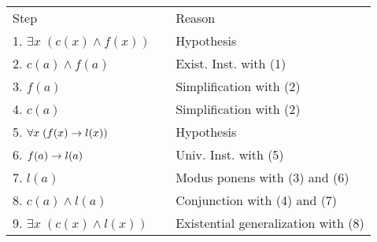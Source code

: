 \begin{questions}
\begin{solution}
\begin{itemize}[itemsep=0pt,parsep=0pt,topsep=0pt,partopsep=0pt]
        \smallskip
        \begin{tabular}{lll}
            Step                    & \hspace{0.15in} & Reason \\
            1. $\exists x\; (c(x) \wedge f(x))$     & & Hypothesis \\
            2. $c(a) \wedge f(a)$                   & & Exist. Inst. with (1) \\
            3. $f(a)$                               & & Simplification with (2) \\
            4. $c(a)$                               & & Simplification with (2) \\
            5. $\forall x\; (f(x) \rightarrow l(x))$        & & Hypothesis \\
            6. $f(a) \rightarrow l(a)$                      & & Univ. Inst. with (5) \\
            7. $l(a)$                               & & Modus ponens with (3) and (6) \\
            8. $c(a) \wedge l(a)$                   & & Conjunction with (4) and (7) \\
            9. $\exists x\; (c(x) \wedge l(x))$     & & Existential generalization with (8) \\
        \end{tabular}
    \end{itemize}
\end{solution}




\end{questions}
